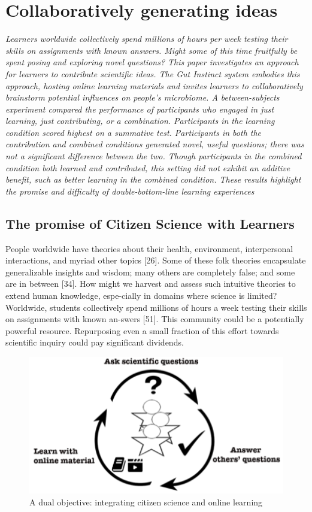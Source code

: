 
\chapter{Collaboratively generating ideas}
\textit{Learners worldwide collectively spend millions of hours per week testing their skills on assignments with known answers. Might some of this time fruitfully be spent posing and exploring novel questions? This paper investigates an approach for learners to contribute scientific ideas. The Gut Instinct system embodies this approach, hosting online learning materials and invites learners to collaboratively brainstorm potential influences on people’s microbiome. A between-subjects experiment compared the performance of participants who engaged in just learning, just contributing, or a combination. Participants in the learning condition scored highest on a summative test. Participants in both the contribution and combined conditions generated novel, useful questions; there was not a significant difference between the two. Though participants in the combined condition both learned and contributed, this setting did not exhibit an additive benefit, such as better learning in the combined condition. These results highlight the promise and difficulty of double-bottom-line learning experiences}

\section{The promise of Citizen Science with Learners}
People worldwide have theories about their health, environment, interpersonal interactions, and myriad other topics [26]. Some of these folk theories encapsulate generalizable insights and wisdom; many others are completely false; and some are in between [34]. How might we harvest and assess such intuitive theories to extend human knowledge, espe-cially in domains where science is limited?  Worldwide, students collectively spend millions of hours a week testing their skills on assignments with known an-swers [51]. This community could be a potentially powerful resource. Repurposing even a small fraction of this effort towards scientific inquiry could pay significant dividends. 

\begin{figure}[h] 
  \centering
  \includegraphics[width=1.0\textwidth]{figures/gutinstinct/gi-1.png}
  \caption[]
{A dual objective: integrating citizen science and online learning}
  \label{fig:gi-1}
\end{figure}

